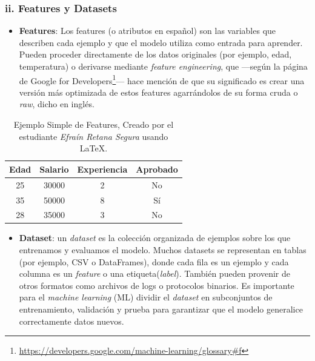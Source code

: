 \documentclass[11pt]{article} %
\begin{document}
\vspace{8pt}
\subsubsection*{ii. Features y Datasets}\vspace{2pt}
\begin{itemize}
    \item \textbf{Features}: Los features (o atributos en español) son las variables que describen cada ejemplo y que el modelo utiliza como entrada para aprender. 
    Pueden proceder directamente de los datos originales (por ejemplo, edad, temperatura) o derivarse mediante \textit{feature engineering}, que —según la página de Google for Developers\footnote{\url{https://developers.google.com/machine-learning/glossary\#f}}— hace mención de que su significado es crear una versión más optimizada de estos features agarrándolos de su forma cruda o \textit{raw}, dicho en inglés.
\end{itemize}

\begin{table}[h]
\centering
\caption{Ejemplo Simple de Features, Creado por el estudiante \textit{Efraín Retana Segura} usando \LaTeX.}
\label{tab:simple_features}
\begin{tabular}{|c|c|c|c|}
\hline
\textbf{Edad} & \textbf{Salario} & \textbf{Experiencia} & \textbf{Aprobado} \\
\hline
25 & 30000 & 2 & No \\
\hline
35 & 50000 & 8 & Sí \\
\hline
28 & 35000 & 3 & No \\
\hline
\end{tabular}
\end{table}

\begin{itemize}
    \item \textbf{Dataset}: un \textit{dataset} es la colección organizada de ejemplos sobre los que entrenamos y evaluamos el modelo. Muchos datasets se representan en tablas (por ejemplo, CSV o DataFrames), donde cada fila es un ejemplo y cada columna es un \textit{feature} o una etiqueta(\textit{label}). También pueden provenir de otros formatos como archivos de logs o protocolos binarios. Es importante para el \textit{machine learning} (ML) dividir el \textit{dataset} en subconjuntos de entrenamiento, validación y prueba para garantizar que el modelo generalice correctamente datos nuevos.
\end{itemize}
\end{document}
